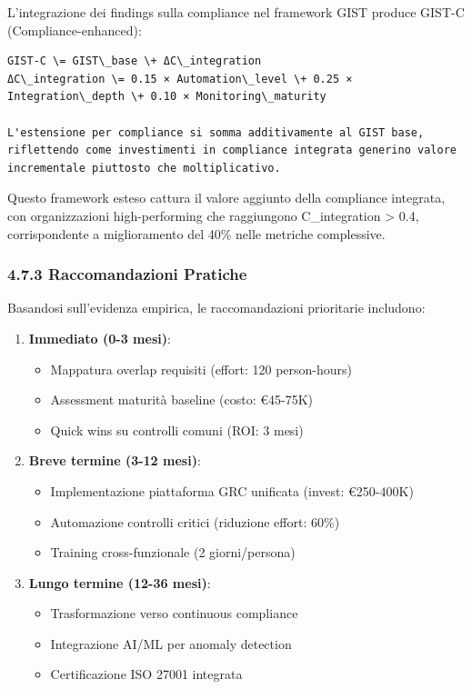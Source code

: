 \documentclass[12pt,a4paper,oneside]{book}
\providecommand{\tightlist}{%
  \setlength{\itemsep}{0pt}\setlength{\parskip}{0pt}
}
\begin{document}
L'integrazione dei findings sulla compliance nel framework GIST produce
GIST-C (Compliance-enhanced):

\begin{verbatim}
GIST-C \= GIST\_base \+ ΔC\_integration  
ΔC\_integration \= 0.15 × Automation\_level \+ 0.25 × Integration\_depth \+ 0.10 × Monitoring\_maturity

L'estensione per compliance si somma additivamente al GIST base, riflettendo come investimenti in compliance integrata generino valore incrementale piuttosto che moltiplicativo.
\end{verbatim}

Questo framework esteso cattura il valore aggiunto della compliance
integrata, con organizzazioni high-performing che raggiungono
C\_integration \textgreater{} 0.4, corrispondente a miglioramento del
40\% nelle metriche complessive.

\subsubsection{4.7.3 Raccomandazioni
Pratiche}\label{raccomandazioni-pratiche}

Basandosi sull'evidenza empirica, le raccomandazioni prioritarie
includono:

\begin{enumerate}
\def\labelenumi{\arabic{enumi}.}
\tightlist
\item
  \textbf{Immediato (0-3 mesi)}:

  \begin{itemize}
  \tightlist
  \item
    Mappatura overlap requisiti (effort: 120 person-hours)
  \item
    Assessment maturità baseline (costo: €45-75K)
  \item
    Quick wins su controlli comuni (ROI: 3 mesi)
  \end{itemize}
\item
  \textbf{Breve termine (3-12 mesi)}:

  \begin{itemize}
  \tightlist
  \item
    Implementazione piattaforma GRC unificata (invest: €250-400K)
  \item
    Automazione controlli critici (riduzione effort: 60\%)
  \item
    Training cross-funzionale (2 giorni/persona)
  \end{itemize}
\item
  \textbf{Lungo termine (12-36 mesi)}:

  \begin{itemize}
  \tightlist
  \item
    Trasformazione verso continuous compliance
  \item
    Integrazione AI/ML per anomaly detection
  \item
    Certificazione ISO 27001 integrata
  \end{itemize}
\end{enumerate}
\end{document}
